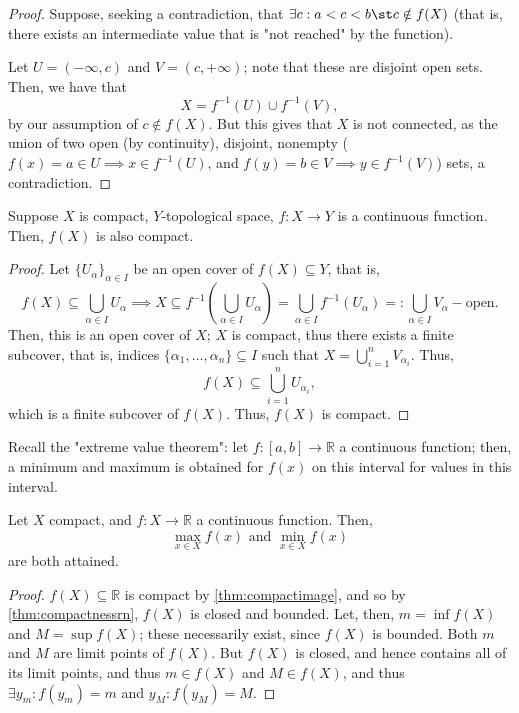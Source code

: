 \begin{proof}
    Suppose, seeking a contradiction, that $\exists c: a < c < b \st c \notin f(X)$ (that is, there exists an intermediate value that is "not reached" by the function).

    Let $U = (- \infty, c)$ and $V = (c, +\infty)$; note that these are disjoint open sets. Then, we have that \[
    X = f^{-1}(U) \cup f^{-1}(V),    
    \]
    by our assumption of $c \notin f(X)$. But this gives that $X$ is not connected, as the union of two open (by continuity), disjoint, nonempty ($f(x) = a \in U \implies x \in f^{-1}(U)$, and $f(y) = b \in V \implies y \in f^{-1}(V)$) sets, a contradiction.
\end{proof}

\begin{theorem}\label{thm:compactimage}
    Suppose $X$ is compact, $Y$-topological space, $f: X \to Y$ is a continuous function. Then, $f(X)$ is also compact.
\end{theorem}

\begin{proof}
    Let $\{U_\alpha\}_{\alpha \in I}$ be an open cover of $f(X) \subseteq Y$, that is, $$f(X) \subseteq \bigcup_{\alpha \in I} U_\alpha \implies X \subseteq f^{-1}(\bigcup_{\alpha \in I} U_\alpha) = \bigcup_{\alpha \in I}f^{-1}(U_\alpha) =: \bigcup_{\alpha \in I} V_\alpha -\text{open}.$$
    Then, this is an open cover of $X$; $X$ is compact, thus there exists a finite subcover, that is, indices $\{\alpha_1, \dots, \alpha_n\} \subseteq I$ such that $X = \bigcup_{i=1}^n V_{\alpha_i}$. Thus, \[
    f(X) \subseteq \bigcup_{i=1}^{n} U_{\alpha_i},
    \]
    which is a finite subcover of $f(X)$. Thus, $f(X)$ is compact.
\end{proof}

\begin{remark}
    Recall the "extreme value theorem": let $f: [a, b] \to \mathbb{R}$ a continuous function; then, a minimum and maximum is obtained for $f(x)$ on this interval for values in this interval.
\end{remark}

\begin{theorem}
    Let $X$ compact, and $f: X \to \mathbb{R}$ a continuous function. Then, \[
    \max_{x \in X} f(x) \text{ and } \min_{x \in X} f(x)    
    \]
    are both attained.
\end{theorem}

\begin{proof}
    $f(X) \subseteq \mathbb{R}$ is compact by \cref{thm:compactimage}, and so by \cref{thm:compactnessrn}, $f(X)$ is closed and bounded. Let, then, $m = \inf f(X)$ and $M = \sup f(X)$; these necessarily exist, since $f(X)$ is bounded. Both $m$ and $M$ are limit points of $f(X)$. But $f(X)$ is closed, and hence contains all of its limit points, and thus $m \in f(X)$ and $M \in f(X)$, and thus $\exists y_m : f(y_m) = m$ and $y_M : f(y_M) = M$.
\end{proof}

